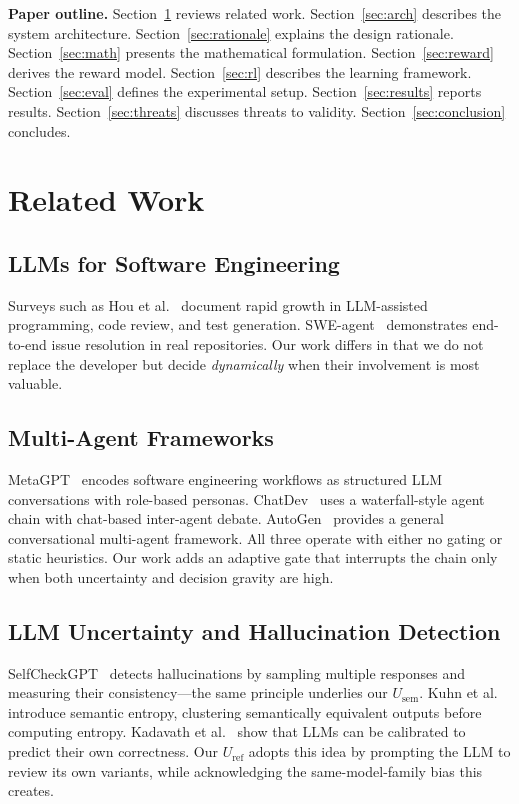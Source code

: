 \documentclass[conference]{IEEEtran}
\newcommand{\Usem}{U_{\mathrm{sem}}}
\newcommand{\Uref}{U_{\mathrm{ref}}}
\begin{document}
\textbf{Paper outline.}
Section~\ref{sec:related} reviews related work.
Section~\ref{sec:arch} describes the system architecture.
Section~\ref{sec:rationale} explains the design rationale.
Section~\ref{sec:math} presents the mathematical formulation.
Section~\ref{sec:reward} derives the reward model.
Section~\ref{sec:rl} describes the learning framework.
Section~\ref{sec:eval} defines the experimental setup.
Section~\ref{sec:results} reports results.
Section~\ref{sec:threats} discusses threats to validity.
Section~\ref{sec:conclusion} concludes.

\section{Related Work}\label{sec:related}

\subsection{LLMs for Software Engineering}
Surveys such as Hou et al.~\cite{hou2024llmse} document rapid growth in
LLM-assisted programming, code review, and test generation.
SWE-agent~\cite{yang2024sweagent} demonstrates end-to-end issue resolution
in real repositories.
Our work differs in that we do not replace the developer but decide
\emph{dynamically} when their involvement is most valuable.

\subsection{Multi-Agent Frameworks}
MetaGPT~\cite{hong2024metagpt} encodes software engineering workflows as
structured LLM conversations with role-based personas.
ChatDev~\cite{qian2024chatdev} uses a waterfall-style agent chain with
chat-based inter-agent debate.
AutoGen~\cite{wu2024autogen} provides a general conversational multi-agent
framework.
All three operate with either no gating or static heuristics.
Our work adds an adaptive gate that interrupts the chain only when both
uncertainty and decision gravity are high.

\subsection{LLM Uncertainty and Hallucination Detection}
SelfCheckGPT~\cite{manakul2023selfcheckgpt} detects hallucinations by
sampling multiple responses and measuring their
consistency---the same principle underlies our $\Usem$.
Kuhn et al.~\cite{kuhn2023semantic} introduce semantic entropy, clustering
semantically equivalent outputs before computing entropy.
Kadavath et al.~\cite{kadavath2022know} show that LLMs can be calibrated
to predict their own correctness.
Our $\Uref$ adopts this idea by prompting the LLM to review its own
variants, while acknowledging the same-model-family bias this creates.
\end{document}

